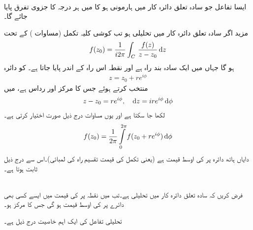 \quad {}\\
 ایسا تفاعل  جو سادہ تعلق دائرہ کار  میں ہارمونی ہو کا   میں ہر درجہ کا جزوی تفرق پایا جائے گا۔  

مزید اگر سادہ تعلق دائرہ کار  میں  تحلیلی ہو تب کوشی کلیہ تکمل (مساوات ) کے تحت
\begin{align}\label{مساوات_مخلوط_مخفی_خواص_الف}
f(z_0)=\frac{1}{i2\pi}\int_C\,\frac{f(z)}{z-z_0}\dif z
\end{align}
ہو گا جہاں   میں  ایک سادہ بند راہ ہے اور نقطہ  اس راہ کے اندر پایا جاتا ہے۔ کو دائرہ
\begin{align*}
z=z_0+re^{i\phi}
\end{align*} 
 منتخب کرتے ہوئے جس کا مرکز  اور رداس  ہے،   میں 
\begin{align*}
z-z_0=re^{i\phi},\quad \dif z=ire^{i\phi}\dif \phi
\end{align*}
لکھا جا سکتا ہے اور یوں مساوات   درج ذیل صورت اختیار کرتی ہے۔
\begin{align}\label{مساوات_مخفی_قوہ_کوشی_تکمل_کلیہ_رداس_زاویہ_الف}
f(z_0)=\frac{1}{2\pi}\int\limits_0^{2\pi} f(z_0+re^{i\phi})\dif \phi
\end{align}
دایاں ہاتھ دائرہ  پر  کی اوسط قیمت ہے (یعنی تکمل کی قیمت تقسیم راہ کی لمبائی)۔اس سے درج ذیل ثابت ہوتا ہے۔

\quad {}\\
فرض کریں کہ سادہ تعلق دائرہ کار  میں  تحلیلی ہے۔تب  میں نقطہ  پر  کی قیمت  میں ایسے کسی بھی دائرے پر  کی اوسط قیمت ہو گی جس کا مرکز  ہو۔ 

تحلیلی تفاعل کی ایک اہم خاصیت درج ذیل ہے۔


